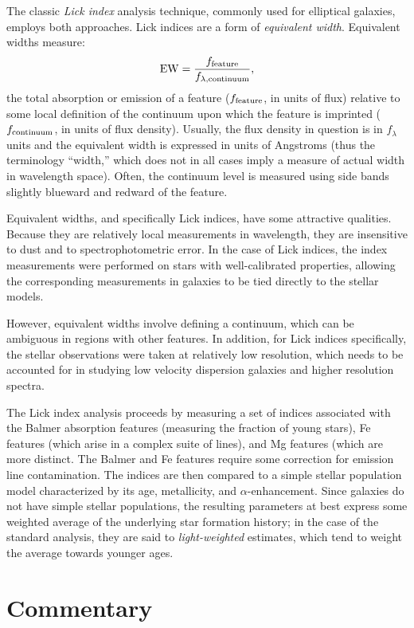 The classic {\it Lick index} analysis technique, commonly used for
elliptical galaxies, employs both approaches. Lick indices are a form
of {\it equivalent width}. Equivalent widths measure:
\begin{equation}
{\rm EW} = \frac{f_{\rm feature}}{f_{\lambda, {\rm continuum}}},
\end{equation}
the total absorption or emission of a feature ($f_{\rm feature}$, in
units of flux) relative to some local definition of the continuum upon
which the feature is imprinted ($f_{\rm continuum}$, in units of flux
density). Usually, the flux density in question is in $f_\lambda$
units and the equivalent width is expressed in units of Angstroms
(thus the terminology ``width,'' which does not in all cases imply a
measure of actual width in wavelength space). Often, the continuum
level is measured using side bands slightly blueward and redward of
the feature.

Equivalent widths, and specifically Lick indices, have some attractive
qualities. Because they are relatively local measurements in
wavelength, they are insensitive to dust and to spectrophotometric
error. In the case of Lick indices, the index measurements were
performed on stars with well-calibrated properties, allowing the
corresponding measurements in galaxies to be tied directly to the
stellar models.

However, equivalent widths involve defining a continuum, which can be
ambiguous in regions with other features.  In addition, for Lick
indices specifically, the stellar observations were taken at
relatively low resolution, which needs to be accounted for in studying
low velocity dispersion galaxies and higher resolution spectra. 

The Lick index analysis proceeds by measuring a set of indices
associated with the Balmer absorption features (measuring the fraction
of young stars), Fe features (which arise in a complex suite of
lines), and Mg features (which are more distinct. The Balmer and Fe
features require some correction for emission line contamination. The
indices are then compared to a simple stellar population model
characterized by its age, metallicity, and $\alpha$-enhancement. Since
galaxies do not have simple stellar populations, the resulting
parameters at best express some weighted average of the underlying
star formation history; in the case of the standard analysis, they are
said to {\it light-weighted} estimates, which tend to weight the
average towards younger ages.

\section{Commentary}

